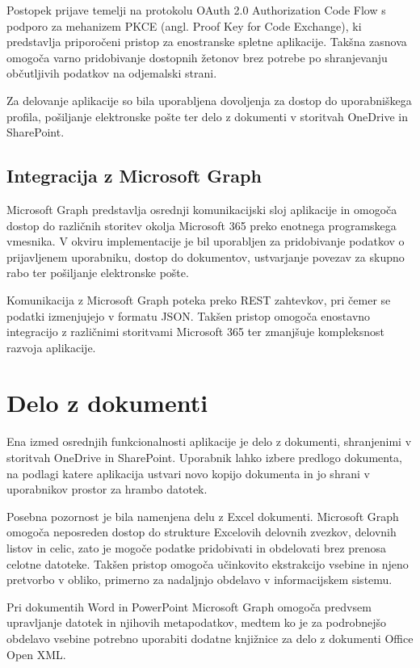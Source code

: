 \documentclass[a4paper, 12pt]{book}
\begin{document}
Postopek prijave temelji na protokolu OAuth 2.0 Authorization Code Flow s podporo za mehanizem PKCE (angl. Proof Key for Code Exchange), ki predstavlja priporočeni pristop za enostranske spletne aplikacije. Takšna zasnova omogoča varno pridobivanje dostopnih žetonov brez potrebe po shranjevanju občutljivih podatkov na odjemalski strani.

Za delovanje aplikacije so bila uporabljena dovoljenja za dostop do uporabniškega profila, pošiljanje elektronske pošte ter delo z dokumenti v storitvah OneDrive in SharePoint.

\subsection{Integracija z Microsoft Graph}

Microsoft Graph predstavlja osrednji komunikacijski sloj aplikacije in omogoča dostop do različnih storitev okolja Microsoft 365 preko enotnega programskega vmesnika. 
V okviru implementacije je bil uporabljen za pridobivanje podatkov o prijavljenem uporabniku, dostop do dokumentov, ustvarjanje povezav za skupno rabo ter pošiljanje elektronske pošte.

Komunikacija z Microsoft Graph poteka preko REST zahtevkov, pri čemer se podatki izmenjujejo v formatu JSON. Takšen pristop omogoča enostavno integracijo z različnimi storitvami Microsoft 365 ter zmanjšuje kompleksnost razvoja aplikacije.

\section{Delo z dokumenti}

Ena izmed osrednjih funkcionalnosti aplikacije je delo z dokumenti, shranjenimi v storitvah OneDrive in SharePoint. Uporabnik lahko izbere predlogo dokumenta, na podlagi katere aplikacija ustvari novo kopijo dokumenta in jo shrani v uporabnikov prostor za hrambo datotek.

Posebna pozornost je bila namenjena delu z Excel dokumenti.
Microsoft Graph omogoča neposreden dostop do strukture Excelovih delovnih zvezkov, delovnih listov in celic, zato je mogoče podatke pridobivati in obdelovati brez prenosa celotne datoteke. Takšen pristop omogoča učinkovito ekstrakcijo vsebine in njeno pretvorbo v obliko, primerno za nadaljnjo obdelavo v informacijskem sistemu.

Pri dokumentih Word in PowerPoint Microsoft Graph omogoča predvsem upravljanje datotek in njihovih metapodatkov, medtem ko je za podrobnejšo obdelavo vsebine potrebno uporabiti dodatne knjižnice za delo z dokumenti Office Open XML.
\end{document}
